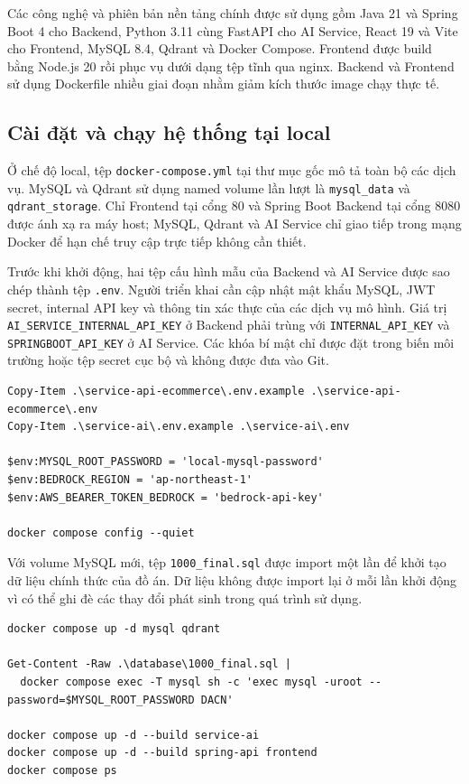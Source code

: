 Các công nghệ và phiên bản nền tảng chính được sử dụng gồm Java 21 và Spring Boot 4 cho Backend, Python 3.11 cùng FastAPI cho AI Service, React 19 và Vite cho Frontend, MySQL 8.4, Qdrant và Docker Compose. Frontend được build bằng Node.js 20 rồi phục vụ dưới dạng tệp tĩnh qua nginx. Backend và Frontend sử dụng Dockerfile nhiều giai đoạn nhằm giảm kích thước image chạy thực tế.

\subsection{Cài đặt và chạy hệ thống tại local}

Ở chế độ local, tệp \texttt{docker-compose.yml} tại thư mục gốc mô tả toàn bộ các dịch vụ. MySQL và Qdrant sử dụng named volume lần lượt là \texttt{mysql\_data} và \texttt{qdrant\_storage}. Chỉ Frontend tại cổng 80 và Spring Boot Backend tại cổng 8080 được ánh xạ ra máy host; MySQL, Qdrant và AI Service chỉ giao tiếp trong mạng Docker để hạn chế truy cập trực tiếp không cần thiết.

Trước khi khởi động, hai tệp cấu hình mẫu của Backend và AI Service được sao chép thành tệp \texttt{.env}. Người triển khai cần cập nhật mật khẩu MySQL, JWT secret, internal API key và thông tin xác thực của các dịch vụ mô hình. Giá trị \texttt{AI\_SERVICE\_INTERNAL\_API\_KEY} ở Backend phải trùng với \texttt{INTERNAL\_API\_KEY} và \texttt{SPRINGBOOT\_API\_KEY} ở AI Service. Các khóa bí mật chỉ được đặt trong biến môi trường hoặc tệp secret cục bộ và không được đưa vào Git.

\begin{lstlisting}[style=terminal,caption={Chuẩn bị cấu hình để chạy hệ thống tại local},label={lst:local-env-prepare}]
Copy-Item .\service-api-ecommerce\.env.example .\service-api-ecommerce\.env
Copy-Item .\service-ai\.env.example .\service-ai\.env

$env:MYSQL_ROOT_PASSWORD = 'local-mysql-password'
$env:BEDROCK_REGION = 'ap-northeast-1'
$env:AWS_BEARER_TOKEN_BEDROCK = 'bedrock-api-key'

docker compose config --quiet
\end{lstlisting}

Với volume MySQL mới, tệp \texttt{1000\_final.sql} được import một lần để khởi tạo dữ liệu chính thức của đồ án. Dữ liệu không được import lại ở mỗi lần khởi động vì có thể ghi đè các thay đổi phát sinh trong quá trình sử dụng.

\begin{lstlisting}[style=terminal,caption={Khởi động các dịch vụ và khởi tạo dữ liệu local},label={lst:local-compose-start}]
docker compose up -d mysql qdrant

Get-Content -Raw .\database\1000_final.sql |
  docker compose exec -T mysql sh -c 'exec mysql -uroot --password=$MYSQL_ROOT_PASSWORD DACN'

docker compose up -d --build service-ai
docker compose up -d --build spring-api frontend
docker compose ps
\end{lstlisting}

